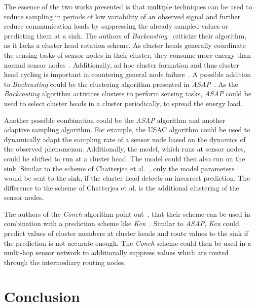 The essence of the two works presented is that multiple techniques can be used
to reduce sampling in periods of low variability of an observed signal and
further reduce communication loads by suppressing the already sampled values or
predicting them at a sink. The authors of
\textit{Backcasting}~\cite{willett2004backcasting} criticize their algorithm,
as it lacks a cluster head rotation scheme. As cluster heads generally
coordinate the sensing tasks of sensor nodes in their cluster, they consume
more energy than normal sensor nodes~\cite{pradhan2016cluster}. Additionally,
ad hoc cluster formation and thus cluster head cycling is important in
countering general node failure~\cite{hu2018fault}. A possible addition to
\textit{Backcasting} could be the clustering algorithm presented in
\textit{ASAP}~\cite{gedik2007asap}. As the \textit{Backcasting} algorithm
activates clusters to perform sensing tasks, \textit{ASAP} could be used to
select cluster heads in a cluster periodically, to spread the energy load.

Another possible combination could be the \textit{ASAP} algorithm and another
adaptive sampling algorithm. For example, the \ac{USAC} algorithm could be used
to dynamically adapt the sampling rate of a sensor node based on the dynamics
of the observed phenomenon. Additionally, the model, which runs at sensor
nodes, could be shifted to run at a cluster head. The model could then also run
on the sink. Similar to the scheme of Chatterjea et
al.~\cite{chatterjea2008adaptive}, only the model parameters would be sent to
the sink, if the cluster head detects an incorrect prediction. The difference
to the scheme of Chatterjea et al. is the additional clustering of the sensor
nodes. 

The authors of the \textit{Conch} algorithm point
out~\cite{silberstein2006constraint}, that their scheme can be used in
combination with a prediction scheme like \textit{Ken}~\cite{jain2004adaptive}.
Similar to \textit{ASAP}, \textit{Ken} could predict values of cluster members
at cluster heads and route values to the sink if the prediction is not accurate
enough. The \textit{Conch} scheme could then be used in a multi-hop sensor
network to additionally suppress values which are routed through the
intermediary routing nodes.

\section{Conclusion}

